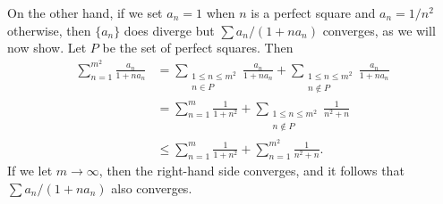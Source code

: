 \begin{enumerate}
\begin{solution}
    On the other hand, if we set $a_n = 1$ when $n$ is a perfect
    square and $a_n = 1/n^2$ otherwise, then $\{a_n\}$ does diverge
    but $\sum a_n/(1 + na_n)$ converges, as we will now show. Let $P$
    be the set of perfect squares. Then
    \begin{align*}
      \sum_{n=1}^{m^2}\frac{a_n}{1 + na_n}
      &= \sum_{\substack{1\leq n\leq m^2 \\ n\in P}}\frac{a_n}{1 + na_n}
      + \sum_{\substack{1\leq n\leq m^2 \\ n\not\in P}}\frac{a_n}{1 + na_n} \\
      &= \sum_{n=1}^m\frac1{1 + n^2}
        + \sum_{\substack{1\leq n\leq m^2 \\ n\not\in P}}\frac1{n^2 + n} \\
      &\leq \sum_{n=1}^m\frac1{1 + n^2} + \sum_{n=1}^{m^2}\frac1{n^2 + n}.
    \end{align*}
    If we let $m\to\infty$, then the right-hand side converges, and it
    follows that $\sum a_n/(1 + na_n)$ also converges.
  \end{solution}
\end{enumerate}

